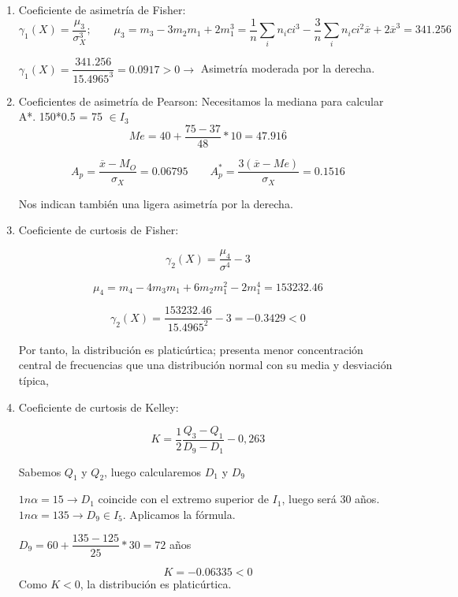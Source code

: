 \begin{enumerate}
	\item Coeficiente de asimetría de Fisher:
	$$\gamma_1(X) = \dfrac{\mu_3}{\sigma_X^3};\qquad
	\mu_3 = m_3 - 3m_2m_1 + 2m_1^3 = \dfrac{1}{n}\sum_{i} n_i ci^3 - \dfrac{3}{n}
	\sum_{i} n_i ci^2\overline{x}  + 2\overline{x}^3 = 341.256$$
    
    $\gamma_1(X) = \dfrac{341.256}{15.4965^3} = 0.0917 > 0 \longrightarrow $ Asimetría moderada por la derecha.

	\item Coeficientes de asimetría de Pearson:
	Necesitamos la mediana para calcular A*. 150*0.5 = 75 $\in I_3$
	$$Me = 40 + \dfrac{75-37}{48}*10 = 47.91\overline{6}$$

	$$A_p = \dfrac{\overline{x}- M_O}{\sigma_X} = 0.06795 \qquad A_p^* = \dfrac{3(\overline{x}- Me)}{\sigma_X} = 0.1516$$
    
    Nos indican también una ligera asimetría por la derecha.

	\item Coeficiente de curtosis de Fisher:

	$$\gamma_2(X) = \dfrac{\mu_4}{\sigma^4} - 3$$
    
    $$\mu_4 = m_4 - 4m_3m_1 + 6m_2m_1^2 - 2m_1^4 = 153232.46$$
    
    $$\gamma_2(X) = \dfrac{153232.46}{15.4965^2} - 3 = -0.3429 < 0$$
	
	Por tanto, la distribución es platicúrtica; presenta menor concentración central de frecuencias que una distribución normal con su media y desviación típica,
	
	\item Coeficiente de curtosis de Kelley:
	
	$$K = \dfrac{1}{2} \dfrac{Q_3 - Q_1}{D_9 - D_1}- 0,263$$
	
	Sabemos $Q_1$ y $Q_2$, luego calcularemos $D_1$ y $D_9$
	
	$1n\alpha = 15 \longrightarrow D_1$ coincide con el extremo superior de $I_1$, luego será 30 años.
	$1n\alpha = 135 \longrightarrow D_9 \in I_5$. Aplicamos la fórmula.
	\begin{center}
	    $ D_9 = 60 + \dfrac{135- 125}{25}*30 = 72 $ años
	\end{center}
	 $$ K = -0.06335 < 0 $$
Como $K < 0$, la distribución es platicúrtica.
\end{enumerate}

